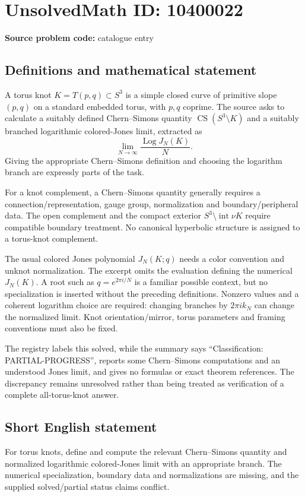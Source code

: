 \documentclass[11pt]{article}
\begin{document}
\section*{UnsolvedMath ID: 10400022}
\textbf{Source problem code:} catalogue entry
\subsection{Definitions and mathematical statement}
A torus knot \(K=T(p,q)\subset S^3\) is a simple closed curve of primitive slope \((p,q)\) on a standard embedded torus, with \(p,q\) coprime. The source asks to calculate a suitably defined Chern--Simons quantity \(\operatorname{CS}(S^3\setminus K)\) and a suitably branched logarithmic colored-Jones limit, extracted as
\[
 \lim_{N\to\infty}\frac{\operatorname{Log} J_N(K)}{N}.
\]
Giving the appropriate Chern--Simons definition and choosing the logarithm branch are expressly parts of the task.

For a knot complement, a Chern--Simons quantity generally requires a connection/representation, gauge group, normalization and boundary/peripheral data. The open complement and the compact exterior \(S^3\setminus\operatorname{int}\nu K\) require compatible boundary treatment. No canonical hyperbolic structure is assigned to a torus-knot complement.

The usual colored Jones polynomial \(J_N(K;q)\) needs a color convention and unknot normalization. The excerpt omits the evaluation defining the numerical \(J_N(K)\). A root such as \(q=e^{2\pi i/N}\) is a familiar possible context, but no specialization is inserted without the preceding definitions. Nonzero values and a coherent logarithm choice are required: changing branches by \(2\pi i k_N\) can change the normalized limit. Knot orientation/mirror, torus parameters and framing conventions must also be fixed.

The registry labels this solved, while the summary says ``Classification: PARTIAL-PROGRESS'', reports some Chern--Simons computations and an understood Jones limit, and gives no formulas or exact theorem references. The discrepancy remains unresolved rather than being treated as verification of a complete all-torus-knot answer.
\subsection{Short English statement}
For torus knots, define and compute the relevant Chern--Simons quantity and normalized logarithmic colored-Jones limit with an appropriate branch. The numerical specialization, boundary data and normalizations are missing, and the supplied solved/partial status claims conflict.
\end{document}
